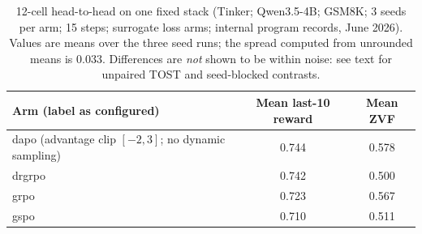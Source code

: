 \begin{table}[t]
\centering
\caption{12-cell head-to-head on one fixed stack (Tinker; Qwen3.5-4B; GSM8K;
3 seeds per arm; 15 steps; surrogate loss arms; internal program records, June
2026). Values are means over the three seed runs; the spread computed from
unrounded means is $0.033$. Differences are \emph{not} shown to be within
noise: see text for unpaired TOST and seed-blocked contrasts.}
\label{tab:p5-h2h}
\small
\begin{tabular}{@{}lcc@{}}
\toprule
Arm (label as configured) & Mean last-10 reward & Mean ZVF \\
\midrule
dapo (advantage clip $[-2,3]$; no dynamic sampling) & 0.744 & 0.578 \\
drgrpo                           & 0.742 & 0.500 \\
grpo                             & 0.723 & 0.567 \\
gspo                             & 0.710 & 0.511 \\
\bottomrule
\end{tabular}
\end{table}

\endinput %

